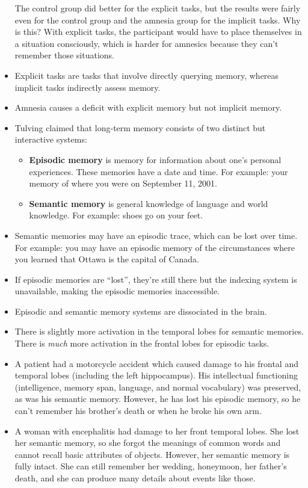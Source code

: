 \documentclass[]{article}
\begin{document}
\begin{itemize}
					The control group did better for the explicit tasks, but the results were fairly even for the control group and the amnesia group for the implicit tasks. Why is this? With explicit tasks, the participant would have to place themselves in a situation consciously, which is harder for amnesics because they can't remember those situations.
				\item Explicit tasks are tasks that involve directly querying memory, whereas implicit tasks indirectly assess memory.
				\item Amnesia causes a deficit with explicit memory but not implicit memory.
				\item Tulving claimed that long-term memory consists of two distinct but interactive systems:
					\begin{itemize}
						\item \textbf{Episodic memory} is memory for information about one's personal experiences. These memories have a date and time. For example: your memory of where you were on September 11, 2001.
						\item \textbf{Semantic memory} is general knowledge of language and world knowledge. For example: shoes go on your feet.
					\end{itemize}
				\item Semantic memories may have an episodic trace, which can be lost over time. For example: you may have an episodic memory of the circumstances where you learned that Ottawa is the capital of Canada.
				\item If episodic memories are ``lost'', they're still there but the indexing system is unavailable, making the episodic memories inaccessible.
				\item Episodic and semantic memory systems are dissociated in the brain.
				\item There is slightly more activation in the temporal lobes for semantic memories. There is \emph{much} more activation in the frontal lobes for episodic tasks.
				\item A patient had a motorcycle accident which caused damage to his frontal and temporal lobes (including the left hippocampus). His intellectual functioning (intelligence, memory span, language, and normal vocabulary) was preserved, as was his semantic memory. However, he has lost his episodic memory, so he can't remember his brother's death or when he broke his own arm.
				\item A woman with encephalitis had damage to her front temporal lobes. She lost her semantic memory, so she forgot the meanings of common words and cannot recall basic attributes of objects. However, her semantic memory is fully intact. She can still remember her wedding, honeymoon, her father's death, and she can produce many details about events like those.
			\end{itemize}
\end{document}
